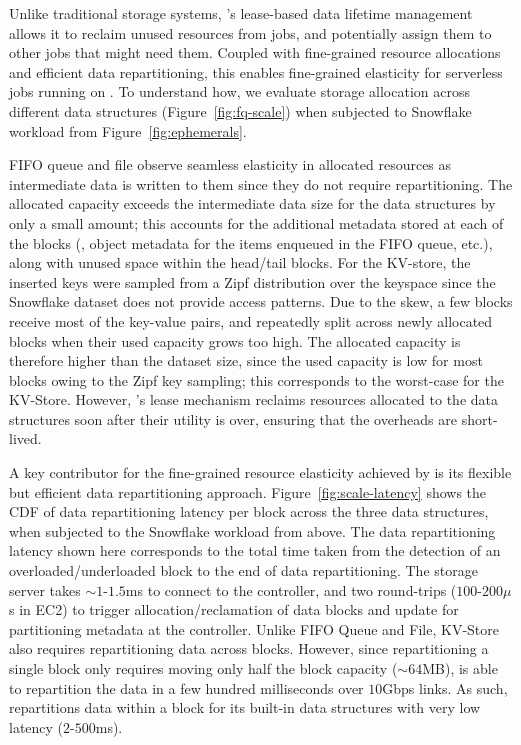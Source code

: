  Unlike traditional storage systems, \jiffy's lease-based data lifetime management allows it to reclaim unused resources from jobs, and potentially assign them to other jobs that might need them. Coupled with fine-grained resource allocations and efficient data repartitioning, this enables fine-grained elasticity for serverless jobs running on \jiffy. To understand how, we evaluate storage allocation across different \jiffy data structures (Figure~\ref{fig:fq-scale}) when subjected to Snowflake workload from Figure~\ref{fig:ephemerals}.

FIFO queue and file observe seamless elasticity in allocated resources as intermediate data is written to them since they do not require repartitioning. The allocated capacity exceeds the intermediate data size for the data structures by only a small amount; this accounts for the additional metadata stored at each of the blocks (\eg, object metadata for the items enqueued in the FIFO queue, etc.), along with unused space within the head/tail blocks. For the KV-store, the inserted keys were sampled from a Zipf distribution over the keyspace since the Snowflake dataset does not provide access patterns. Due to the skew, a few \jiffy blocks receive most of the key-value pairs, and repeatedly split across newly allocated blocks when their used capacity grows too high. The allocated capacity is therefore higher than the dataset size, since the used capacity is low for most blocks owing to the Zipf key sampling; this corresponds to the worst-case for the KV-Store. However, \jiffy's lease mechanism reclaims resources allocated to the data structures soon after their utility is over, ensuring that the overheads are short-lived. %


 A key contributor for the fine-grained resource elasticity achieved by \jiffy is its flexible but efficient data repartitioning approach. Figure~\ref{fig:scale-latency} shows the CDF of data repartitioning latency per block across the three data structures, when subjected to the Snowflake workload from above. The data repartitioning latency shown here corresponds to the total time taken from the detection of an overloaded/underloaded block to the end of data repartitioning. The storage server takes ${\sim}1$-$1.5$ms to connect to the controller, and two round-trips ($100$-$200\mu$s in EC2) to trigger allocation/reclamation of data blocks and update for partitioning metadata at the controller. Unlike FIFO Queue and File, KV-Store also requires repartitioning data across blocks. However, since repartitioning a single block only requires moving only half the block capacity (${\sim}64$MB), \jiffy is able to repartition the data in a few hundred milliseconds over $10$Gbps links. As such, \jiffy repartitions data within a block for its built-in data structures with very low latency ($2$-$500$ms).

